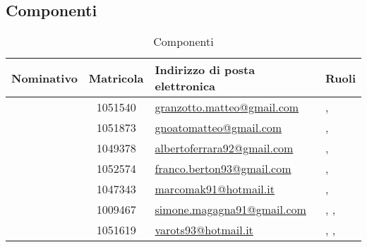 \subsection{Componenti}
\begin{table}[H]
	\begin{center}
		\setlength{\extrarowheight}{\jot}
		\begin{tabular}{|c|c|p{5cm}|p{4.3cm}|}
			\hline
			\textbf{Nominativo} & \textbf{Matricola} & \raggedright \textbf{Indirizzo di posta elettronica} & \textbf{Ruoli} \\[1ex]
			\hline
	 		\GR	& 1051540	& \href{mailto:granzotto.matteo@gmail.com}{granzotto.matteo@gmail.com} 	& \Res, \Ana 	\\[1ex]
			\hline
			\GN		& 1051873	& \href{mailto:gnoatomatteo@gmail.com}{gnoatomatteo@gmail.com} 			& \Res, \Ana 	\\[1ex]
			\hline
			\AF		& 1049378	& \href{mailto:albertoferrara92@gmail.com}{albertoferrara92@gmail.com} 	& \Amm, \Ana 	\\[1ex]
			\hline
			\FB 		& 1052574	& \href{mailto:franco.berton93@gmail.com}{franco.berton93@gmail.com} 	& \Amm, \Ana	\\[1ex]
			\hline
			\MP		& 1047343	& \href{mailto:marcomak91@hotmail.it}{marcomak91@hotmail.it} 			& \Ver, \Ana	\\[1ex]
			\hline
			\SM		& 1009467	& \href{mailto:simone.magagna91@gmail.com}{simone.magagna91@gmail.com} 	& \Ver, \Ana, \Amm 	\\[1ex]
			\hline
			\MV		& 1051619	& \href{mailto:varots93@hotmail.it}{varots93@hotmail.it} & \Ver, \Ana, \Amm \\[1ex]
			\hline	
		\end{tabular}
	\end{center}
	\caption{Componenti}
\end{table}


